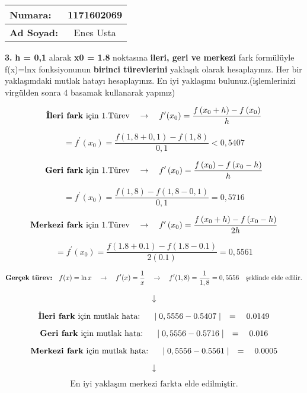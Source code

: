 \documentclass[a4paper,10pt]{article}
\begin{document}
\pagebreak


  \begin{tabular}{ | l  c | }
    \hline
    \textbf{Numara:} & 1171602069 \\ \hline
    \textbf{Ad Soyad:} & Enes Usta \\
    \hline
  \end{tabular}

\vspace{1cm}

\textbf{3.} \textbf{h = 0,1} alarak \textbf{x0 = 1.8} noktasına \textbf{ileri, geri ve merkezi} fark formülüyle f(x)=lnx fonksiyonunun \textbf{birinci türevlerini} yaklaşık olarak hesaplayınız. Her bir yaklaşımdaki mutlak hatayı hesaplayınız. En iyi yaklaşımı bulunuz.(işlemlerinizi virgülden sonra 4 basamak kullanarak yapınız)

\vspace{0.6cm}

$$\text{\textbf{İleri fark} için 1.Türev} \quad \rightarrow \quad f^{\prime}(x_{0})=\frac{f\left(x_{0}+h\right)-f\left(x_{0}\right)}{h}$$

$$ = f^{\prime}\left(x_{0}\right)=\frac{f(1,8+0,1)-f(1,8)}{0,1}<0,5407$$

$$\text{\textbf{Geri fark} için 1.Türev} \quad \rightarrow \quad f^{\prime}\left(x_{0}\right)=\frac{f\left(x_{0}\right)-f\left(x_{0}-h\right)}{h}$$ 

$$ = f^{\prime}\left(x_{0}\right)=\frac{f(1,8)-f(1,8-0,1)}{0,1}=0,5716$$

$$\text{\textbf{Merkezi fark} için 1.Türev} \quad \rightarrow \quad f^{\prime}\left(x_{0}\right)=\frac{f\left(x_{0}+h\right)-f\left(x_{0}-h\right)}{2 h}$$

$$ = f^{\prime}\left(x_{0}\right)=\frac{f(1.8+0.1)-f(1.8-0.1)}{2(0.1)}=0,5561$$

$$\text{\textbf{Gerçek türev:}} \quad f(x)=\ln x \quad \rightarrow \quad  f^{\prime}(x)=\frac{1}{x} \quad \rightarrow \quad f^{\prime}(1,8)=\frac{1}{1,8}=0,5556 \quad \text{şeklinde elde edilir.}$$

$$\downarrow$$

$$\text{\textbf{İleri fark} için mutlak hata: } \quad \mid0,5556-0.5407\mid\quad=\quad0.0149$$

$$\text{\textbf{Geri fark} için mutlak hata: } \quad \mid0,5556-0.5716\mid\quad=\quad0.016$$

$$\text{\textbf{Merkezi fark} için mutlak hata: } \quad \mid0,5556-0.5561\mid\quad=\quad0.0005$$

$$\downarrow$$

$$\text{En iyi yaklaşım merkezi farkta elde edilmiştir.}$$
\end{document}
